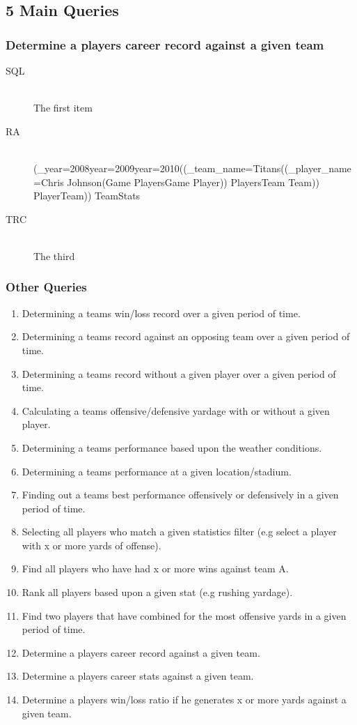 \documentclass[12pt,letterpaper]{article}
\begin{document}
\subsection{5 Main Queries}

\subsubsection{Determine a players career record against a given team}
\begin{description}
  \item[SQL] \hfill \\
  The first item
  \item[RA] \hfill \\
  (\Pi_year=2008\vee year=2009\vee year=2010((\sigma_team_name=Titans((\sigma_player_name=Chris Johnson(Game \bowtie PlayersGame \bowtie Player)) \bowtie PlayersTeam \bowtie Team)) \bowtie PlayerTeam)) \bowtie TeamStats
  \item[TRC] \hfill \\
  The third
\end{description}

\subsubsection{Other Queries}

\begin{enumerate}
\item Determining a teams win/loss record over a given period of time.
\item Determining a teams record against an opposing team over a given period of time.
\item Determining a teams record without a given player over a given period of time.
\item Calculating a teams offensive/defensive yardage with or without a given player.
\item Determining a teams performance based upon the weather conditions.
\item Determining a teams performance at a given location/stadium.
\item Finding out a teams best performance offensively or defensively in a given period of time.
\item Selecting all players who match a given statistics filter (e.g select a player with x or more yards of offense).
\item Find all players who have had x or more wins against team A.
\item Rank all players based upon a given stat (e.g rushing yardage).
\item Find two players that have combined for the most offensive yards in a given period of time.
\item Determine a players career record against a given team.
\item Determine a players career stats against a given team.
\item Determine a players win/loss ratio if he generates x or more yards against a given team.
\end{enumerate}
\end{document}
